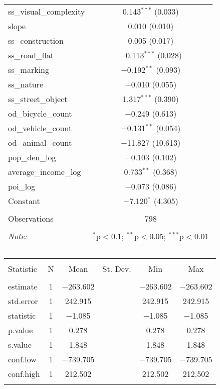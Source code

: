 \begin{table}[!htbp]
\begin{tabular}{@{\extracolsep{1pt}}lc}
  ss\_visual\_complexity & 0.143$^{***}$ (0.033) \\ 
  slope & 0.010 (0.010) \\ 
  ss\_construction & 0.005 (0.017) \\ 
  ss\_road\_flat & $-$0.113$^{***}$ (0.028) \\ 
  ss\_marking & $-$0.192$^{**}$ (0.093) \\ 
  ss\_nature & $-$0.010 (0.055) \\ 
  ss\_street\_object & 1.317$^{***}$ (0.390) \\ 
  od\_bicycle\_count & $-$0.249 (0.613) \\ 
  od\_vehicle\_count & $-$0.131$^{**}$ (0.054) \\ 
  od\_animal\_count & $-$11.827 (10.613) \\ 
  pop\_den\_log & $-$0.103 (0.102) \\ 
  average\_income\_log & 0.733$^{**}$ (0.368) \\ 
  poi\_log & $-$0.073 (0.086) \\ 
  Constant & $-$7.120$^{*}$ (4.305) \\ 
 \hline \\[-1.8ex] 
Observations & 798 \\ 
\hline 
\hline \\[-1.8ex] 
\textit{Note:}  & \multicolumn{1}{r}{$^{*}$p$<$0.1; $^{**}$p$<$0.05; $^{***}$p$<$0.01} \\ 
\end{tabular} 
\end{table} 

\begin{table}[!htbp] \centering 
  \caption{} 
  \label{} 
\small 
\begin{tabular}{@{\extracolsep{1pt}}lccccc} 
\\[-1.8ex]\hline 
\hline \\[-1.8ex] 
Statistic & \multicolumn{1}{c}{N} & \multicolumn{1}{c}{Mean} & \multicolumn{1}{c}{St. Dev.} & \multicolumn{1}{c}{Min} & \multicolumn{1}{c}{Max} \\ 
\hline \\[-1.8ex] 
estimate & 1 & $-$263.602 &  & $-$263.602 & $-$263.602 \\ 
std.error & 1 & 242.915 &  & 242.915 & 242.915 \\ 
statistic & 1 & $-$1.085 &  & $-$1.085 & $-$1.085 \\ 
p.value & 1 & 0.278 &  & 0.278 & 0.278 \\ 
s.value & 1 & 1.848 &  & 1.848 & 1.848 \\ 
conf.low & 1 & $-$739.705 &  & $-$739.705 & $-$739.705 \\ 
conf.high & 1 & 212.502 &  & 212.502 & 212.502 \\ 
\hline \\[-1.8ex] 
\end{tabular} 
\end{table} 

